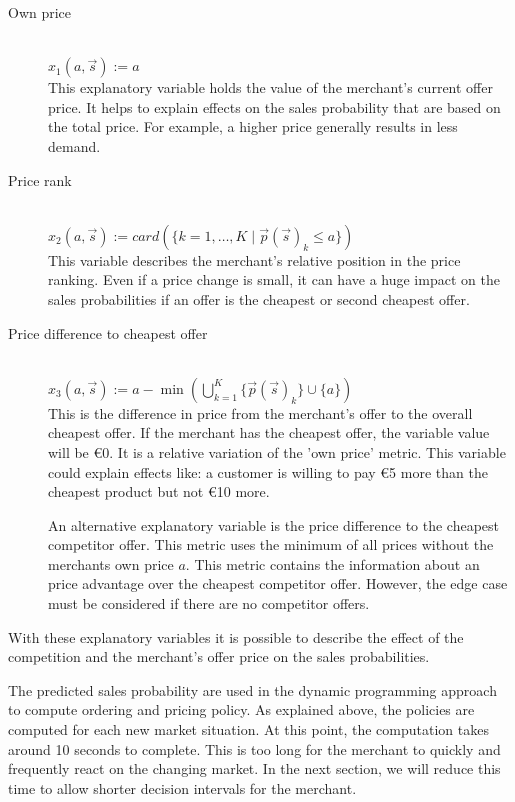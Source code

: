 \begin{description}
	\item [Own price] \hfill \\
		$x_1(a, \vec{s}) := a$ \\
		This explanatory variable holds the value of the merchant's current offer price.
		It helps to explain effects on the sales probability that are based on the total price.
		For example, a higher price generally results in less demand.
	\item [Price rank] \hfill \\
		$x_2(a, \vec{s}) := card(\{k=1,\ldots, K \mid \vec{p}(\vec{s})_k \leq a\})$ \\
		This variable describes the merchant's relative position in the price ranking.
		Even if a price change is small, it can have a huge impact on the sales probabilities if an offer is the cheapest or second cheapest offer.
	\item [Price difference to cheapest offer] \hfill \\
		$x_3(a, \vec{s}) := a - \min( \bigcup_{k=1}^K\{\vec{p}(\vec{s})_k\} \cup \{a\})$ \\
		This is the difference in price from the merchant's offer to the overall cheapest offer.
		If the merchant has the cheapest offer, the variable value will be €0.
		It is a relative variation of the 'own price' metric.
		This variable could explain effects like: a customer is willing to pay €5 more than the cheapest product but not €10 more.
		
		An alternative explanatory variable is the price difference to the cheapest competitor offer. This metric uses the minimum of all prices without the merchants own price $a$.
		This metric contains the information about an price advantage over the cheapest competitor offer.
		However, the edge case must be considered if there are no competitor offers.
\end{description}

With these explanatory variables it is possible to describe the effect of the competition and the merchant's offer price on the sales probabilities.

The predicted sales probability are used in the dynamic programming approach to compute ordering and pricing policy.
As explained above, the policies are computed for each new market situation.
At this point, the computation takes around 10 seconds to complete.
This is too long for the merchant to quickly and frequently react on the changing market.
In the next section, we will reduce this time to allow shorter decision intervals for the merchant.

